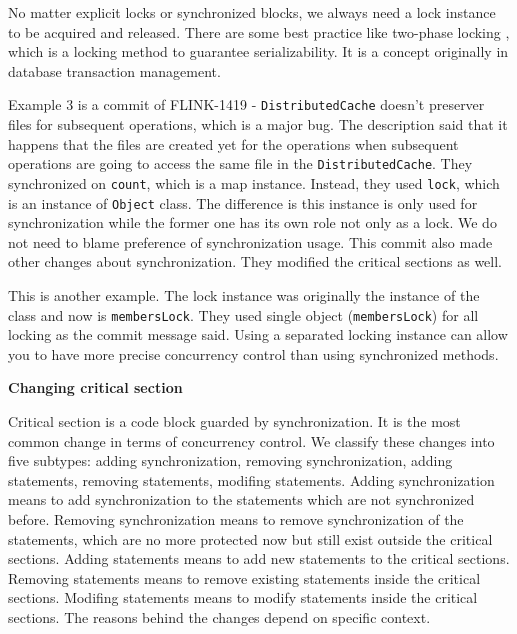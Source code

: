 No matter explicit locks or synchronized blocks, we always need a lock instance to be acquired and released.  There are some best practice like two-phase locking \cite{journals/cacm/EswarranGLT76}, which is a locking method to guarantee serializability. It is a concept originally in database transaction management. %


Example 3 is a commit of FLINK-1419 - \texttt{DistributedCache} doesn't preserver files for subsequent operations, which is a major bug. The description said that it happens that the files are created yet for the operations when subsequent operations are going to access the same file in the \texttt{DistributedCache}. They synchronized on \texttt{count}, which is a map instance. Instead, they used \texttt{lock}, which is an instance of \texttt{Object} class. The difference is this instance is only used for synchronization while the former one has its own role not only as a lock. We do not need to blame preference of synchronization usage. This commit also made other changes about synchronization. They modified the critical sections as well.


This is another example. The lock instance was originally the instance of the class and now is \texttt{membersLock}. They used single object (\texttt{membersLock}) for all locking as the commit message said. Using a separated locking instance can allow you to have more precise concurrency control than using synchronized methods.

\textbf{Changing critical section}

Critical section is a code block guarded by synchronization. It is the most common change in terms of concurrency control. We classify these changes into five subtypes: adding synchronization, removing synchronization, adding statements, removing statements, modifing statements. Adding synchronization means to add synchronization to the statements which are not synchronized before. Removing synchronization means to remove synchronization of the statements, which are no more protected now but still exist outside the critical sections. Adding statements means to add new statements to the critical sections. Removing statements means to remove existing statements inside the critical sections. Modifing statements means to modify statements inside the critical sections. The reasons behind the changes depend on specific context.

